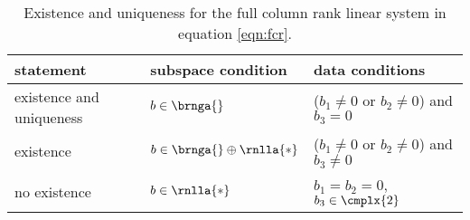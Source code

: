 \begin{table}[t]
	\begin{center}
		\begin{tabular}{lll}
		  statement & subspace condition & data conditions\\\hline
		  existence and uniqueness & $b\in\brnga{}$ & ($b_{1}\ne0$ or $b_{2}\ne0$) and $b_{3} = 0 $ \\[3pt]
		  existence  & $b\in\brnga{} \oplus \rnlla{*} $ &  ($b_{1}\ne0$ or $b_{2}\ne0$) and $b_{3} \ne 0 $ \\[3pt]
		  no existence & $b\in\rnlla{*}$ & $b_{1} = b_{2} = 0$, $b_{3}\in\cmplx{2}$ \\
		\end{tabular}
	\end{center}
	\caption{Existence and uniqueness for the full column rank linear system in equation \eqref{eqn:fcr}.}
	\label{tab:ftola spaces}
\end{table}%

\endinput  %